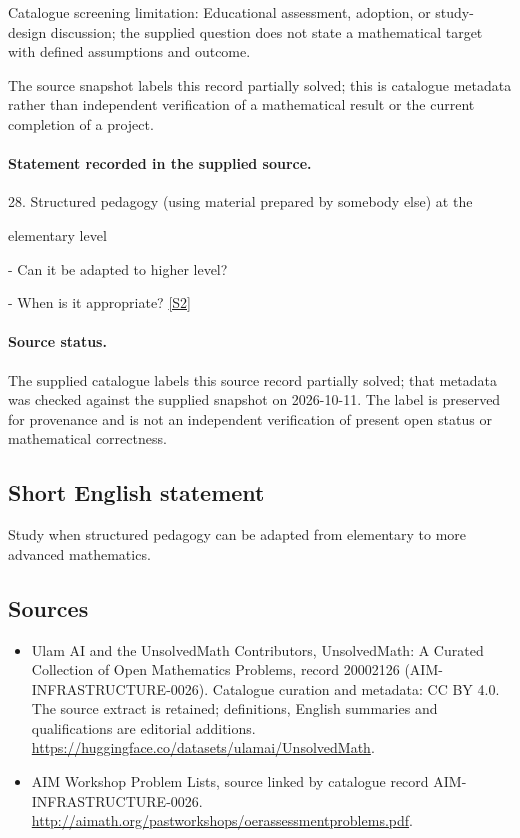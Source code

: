 \documentclass[11pt]{article}
\begin{document}
Catalogue screening limitation: Educational assessment, adoption, or study-design discussion; the supplied question does not state a mathematical target with defined assumptions and outcome.

The source snapshot labels this record partially solved; this is catalogue metadata rather than independent verification of a mathematical result or the current completion of a project.
\paragraph{Statement recorded in the supplied source.}
28. Structured pedagogy (using material prepared by somebody else) at the

elementary level

- Can it be adapted to higher level?

- When is it appropriate? \href{http://aimath.org/pastworkshops/oerassessmentproblems.pdf}{[S2]}
\paragraph{Source status.}
The supplied catalogue labels this source record partially solved; that metadata was checked against the supplied snapshot on 2026-10-11. The label is preserved for provenance and is not an independent verification of present open status or mathematical correctness.
\subsection{Short English statement}
Study when structured pedagogy can be adapted from elementary to more advanced mathematics.
\subsection{Sources}
\begin{itemize}
\item[S1] Ulam AI and the UnsolvedMath Contributors, UnsolvedMath: A Curated Collection of Open Mathematics Problems, record 20002126 (AIM-INFRASTRUCTURE-0026). Catalogue curation and metadata: CC BY 4.0. The source extract is retained; definitions, English summaries and qualifications are editorial additions.
\url{https://huggingface.co/datasets/ulamai/UnsolvedMath}.
\item[S2] AIM Workshop Problem Lists, source linked by catalogue record AIM-INFRASTRUCTURE-0026.
\url{http://aimath.org/pastworkshops/oerassessmentproblems.pdf}.
\end{itemize}
\end{document}
